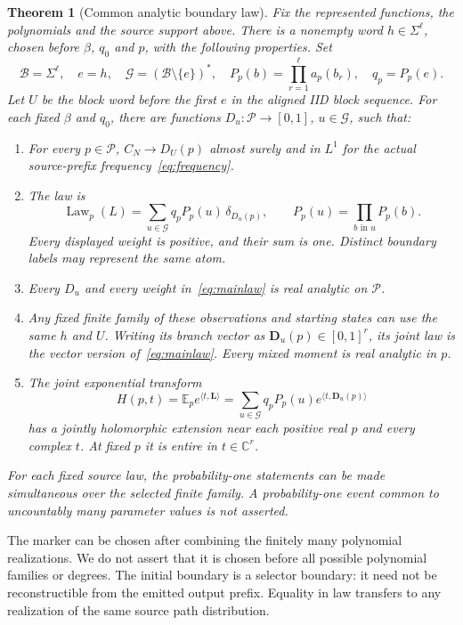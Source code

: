 \documentclass[11pt]{article}
\newtheorem{theorem}{Theorem}[section]
\theoremstyle{definition}
\theoremstyle{remark}
\newcommand{\C}{\mathbb C}
\newcommand{\E}{\mathbb E}
\newcommand{\Law}{\operatorname{Law}}
\newcommand{\Gap}{\mathcal G}
\begin{document}
\begin{theorem}[Common analytic boundary law]\label{thm:main}
Fix the represented functions, the polynomials and the source support above. There is a nonempty word $h\in\Sigma^\ell$, chosen before $\beta$, $q_0$ and $p$, with the following properties. Set
\[
 \mathcal B=\Sigma^\ell,\quad e=h,\quad
 \Gap=(\mathcal B\setminus\{e\})^*,\quad
 P_p(b)=\prod_{r=1}^{\ell}a_p(b_r),\quad q_p=P_p(e).
\]
Let $U$ be the block word before the first $e$ in the aligned IID block sequence. For each fixed $\beta$ and $q_0$, there are functions $D_u:\mathcal P\to[0,1]$, $u\in\Gap$, such that:
\begin{enumerate}
\item For every $p\in\mathcal P$, $C_N\to D_U(p)$ almost surely and in $L^1$ for the actual source-prefix frequency~\eqref{eq:frequency}.
\item The law is
\begin{equation}\label{eq:mainlaw}
 \Law_p(L)=\sum_{u\in\Gap}q_pP_p(u)\,\delta_{D_u(p)},
 \qquad P_p(u)=\prod_{b\text{ in }u}P_p(b).
\end{equation}
Every displayed weight is positive, and their sum is one. Distinct boundary labels may represent the same atom.
\item Every $D_u$ and every weight in~\eqref{eq:mainlaw} is real analytic on $\mathcal P$.
\item Any fixed finite family of these observations and starting states can use the same $h$ and $U$. Writing its branch vector as $\mathbf D_u(p)\in[0,1]^r$, its joint law is the vector version of~\eqref{eq:mainlaw}. Every mixed moment is real analytic in $p$.
\item The joint exponential transform
\begin{equation}\label{eq:transform}
 H(p,t)=\E_p e^{\langle t,\mathbf L\rangle}
       =\sum_{u\in\Gap}q_pP_p(u)e^{\langle t,\mathbf D_u(p)\rangle}
\end{equation}
has a jointly holomorphic extension near each positive real $p$ and every complex $t$. At fixed $p$ it is entire in $t\in\C^r$.
\end{enumerate}
For each fixed source law, the probability-one statements can be made simultaneous over the selected finite family. A probability-one event common to uncountably many parameter values is not asserted.
\end{theorem}

The marker can be chosen after combining the finitely many polynomial realizations. We do not assert that it is chosen before all possible polynomial families or degrees. The initial boundary is a selector boundary: it need not be reconstructible from the emitted output prefix. Equality in law transfers to any realization of the same source path distribution.
\end{document}

